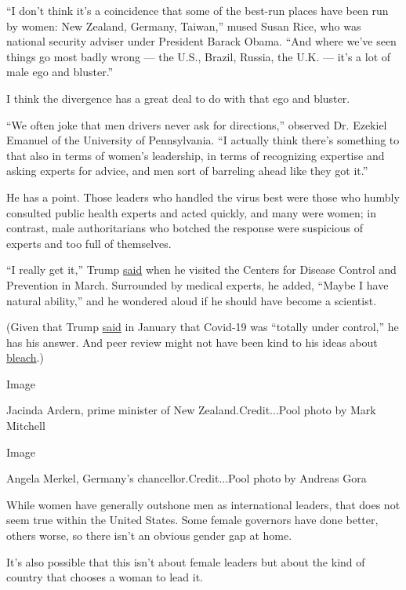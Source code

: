 ``I don't think it's a coincidence that some of the best-run places have
been run by women: New Zealand, Germany, Taiwan,'' mused Susan Rice, who
was national security adviser under President Barack Obama. ``And where
we've seen things go most badly wrong --- the U.S., Brazil, Russia, the
U.K. --- it's a lot of male ego and bluster.''

I think the divergence has a great deal to do with that ego and bluster.

``We often joke that men drivers never ask for directions,'' observed
Dr. Ezekiel Emanuel of the University of Pennsylvania. ``I actually
think there's something to that also in terms of women's leadership, in
terms of recognizing expertise and asking experts for advice, and men
sort of barreling ahead like they got it.''

He has a point. Those leaders who handled the virus best were those who
humbly consulted public health experts and acted quickly, and many were
women; in contrast, male authoritarians who botched the response were
suspicious of experts and too full of themselves.

``I really get it,'' Trump
\href{https://www.whitehouse.gov/briefings-statements/remarks-president-trump-tour-centers-disease-control-prevention-atlanta-ga/}{said}
when he visited the Centers for Disease Control and Prevention in March.
Surrounded by medical experts, he added, ``Maybe I have natural
ability,'' and he wondered aloud if he should have become a scientist.

(Given that Trump
\href{https://www.nytimes3xbfgragh.onion/2020/03/15/opinion/trump-coronavirus.html}{said}
in January that Covid-19 was ``totally under control,'' he has his
answer. And peer review might not have been kind to his ideas about
\href{https://www.nytimes3xbfgragh.onion/2020/04/24/us/politics/trump-inject-disinfectant-bleach-coronavirus.html}{bleach}.)

Image

Jacinda Ardern, prime minister of New Zealand.Credit...Pool photo by
Mark Mitchell

Image

Angela Merkel, Germany's chancellor.Credit...Pool photo by Andreas Gora

While women have generally outshone men as international leaders, that
does not seem true within the United States. Some female governors have
done better, others worse, so there isn't an obvious gender gap at home.

It's also possible that this isn't about female leaders but about the
kind of country that chooses a woman to lead it.

